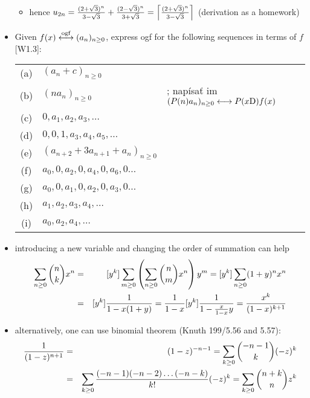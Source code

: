 \documentclass[10pt, a4paper]{article}
\newcommand*\ruleline[1]{\par\noindent\raisebox{.8ex}{\makebox[\linewidth]{\hrulefill\hspace{1ex}\raisebox{-.8ex}{#1}\hspace{1ex}\hrulefill}}}
\def\ans#1{\big[\hskip 2mm {#1}\hskip 2mm\big]}
\def\ogf{\overset{{\rm ogf}}{\longleftrightarrow}}
\def\xD{x{\rm D}}
\begin{document}
\begin{itemize}
\begin{itemize}
    \item hence $u_{2n} = {(2+\sqrt 3)^n\over 3-\sqrt 3} + {(2-\sqrt 3)^n\over 3+\sqrt 3} = \left\lceil {(2+\sqrt 3)^n\over 3-\sqrt 3}\right\rceil$
            (derivation as a homework)
\end{itemize}

\item
Given $f(x)\ogf (a_n)_{n\ge 0}$, express ogf for the following sequences in terms of $f$ [W1.3]:\\
\setlength\extrarowheight{1mm}
\begin{tabular}{cl@{\hskip 5mm}l}
    (a) & $(a_n+c)_{n\ge 0}$ & \ans{$f(x)+c/(1-x)$}\\
    (b) & $(na_n)_{n\ge 0}$ & \ans{$\xD f(x)$}; \qquad napísať im $(P(n)a_n)_{n\ge 0} \longleftrightarrow P(\xD)f(x)$\\
    (c) & $0, a_1, a_2, a_3, \dots$ & \ans{$f(x)-a_0$}\\
    (d) & $0, 0, 1, a_3, a_4, a_5,\dots$ & \ans{$f(x)-a_0-a_1x+(1-a_2)x^2$}\\
    (e) & $(a_{n+2}+3a_{n+1}+a_n)_{n\ge 0}$ & \ans{$(f-a_0-a_1x)/x^2 + 3(f-a_0)/x + f$}\\
    (f) & $a_0, 0, a_2, 0, a_4, 0, a_6, 0\dots$ & \ans{$(f(x)+f(-x))/2$}\\
    (g) & $a_0, 0, a_1, 0, a_2, 0, a_3, 0\dots$ & \ans{$f(x^2)$}\\
    (h) & $a_1, a_2, a_3, a_4,\dots$ & \ans{$(f(x)-a_0)/x$}\\
    (i) & $a_0, a_2, a_4, \dots$ & \ans{$(f(\sqrt{x})+f(-\sqrt{x}))/2$}\\
\end{tabular}

\end{itemize}

\newpage

\ruleline{GFs of two variables}
\begin{itemize}
    \item introducing a new variable and changing the order of summation can help
    \begin{eqnarray}
        \sum_{n\ge 0} {n\choose k}x^n &=& [y^k]\sum_{m\ge 0} \left(\sum_{n\ge 0} {n\choose m}x^n\right)y^m = [y^k]\sum_{n\ge 0} (1+y)^nx^n\nonumber\\
        &=& [y^k] {1\over 1-x(1+y)} = {1\over 1-x}[y^k] {1\over 1-{x\over 1-x}y} = {x^k\over (1-x)^{k+1}} \label{binomial}
    \end{eqnarray}

    \item alternatively, one can use binomial theorem (Knuth 199/5.56 and 5.57):
    \begin{eqnarray*}
        {1\over (1-z)^{n+1}} &=& (1-z)^{-n-1} =\sum_{k\ge 0} {-n-1\choose k}(-z)^k\\
                             &=& \sum_{k\ge 0} {(-n-1)(-n-2)\dots(-n-k)\over k!}(-z)^k = \sum_{k\ge 0} {n+k\choose n}z^k
    \end{eqnarray*}
\end{itemize}
\end{document}
